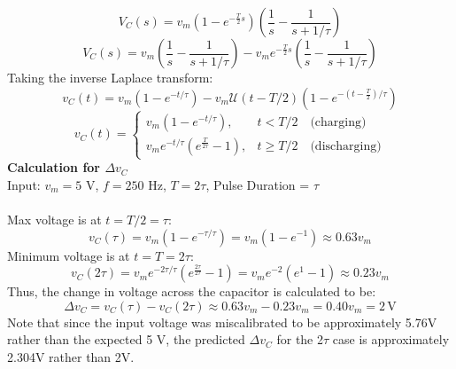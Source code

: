 \documentclass[12pt]{article}
\begin{document}
\[V_C(s) = v_m(1-e^{-\frac{T}{2}s})\left(\frac{1}{s} - \frac{1}{s + 1/\tau}\right)\]
\[V_C(s) = v_m\left(\frac{1}{s} - \frac{1}{s + 1/\tau}\right)-v_m e^{-\frac{T}{2}s}\left(\frac{1}{s} - \frac{1}{s + 1/\tau}\right)\]
Taking the inverse Laplace transform:
\[v_C(t) = v_m\left(1 - e^{-t/\tau}\right) - v_m \mathscr{U}(t-T/2)\left(1 - e^{-\left(t-\frac{T}{2}\right)/\tau}\right)\]
\[\boxed{v_C(t) =
\begin{cases}
v_m\left(1 - e^{-t/\tau}\right), & t < T/2 \quad \text{(charging)}\\
v_me^{-t/\tau}\left(e^{\frac{T}{2\tau}}-1\right), & t \ge T/2\quad \text{(discharging)}
\end{cases}}\]
\newpage\noindent
\textbf{Calculation for $\Delta v_C$}\\
Input: $v_m = 5$ V, $f=250$ Hz, $T=2\tau$, Pulse Duration = $\tau$\\\\
Max voltage is at $t=T/2 = \tau$:
\[v_C(\tau) = v_m\left(1 - e^{-\tau/\tau}\right) = v_m\left(1 - e^{-1}\right) \approx 0.63v_m\]
Minimum voltage is at $t=T = 2\tau$:
\[v_C(2\tau) = v_me^{-2\tau/\tau}\left(e^{\frac{2\tau}{2\tau}}-1\right) = v_me^{-2}\left(e^{1}-1\right) \approx 0.23v_m\]
Thus, the change in voltage across the capacitor is calculated to be:
\[\Delta v_C = v_C(\tau) - v_C(2\tau) \approx 0.63v_m - 0.23v_m = 0.40v_m = 2 \, \text{V}\]
Note that since the input voltage was miscalibrated to be approximately 5.76V rather than the expected 5 V, the predicted $\Delta v_C$ for the 2$\tau$ case is approximately 2.304V rather than 2V.
\end{document}
